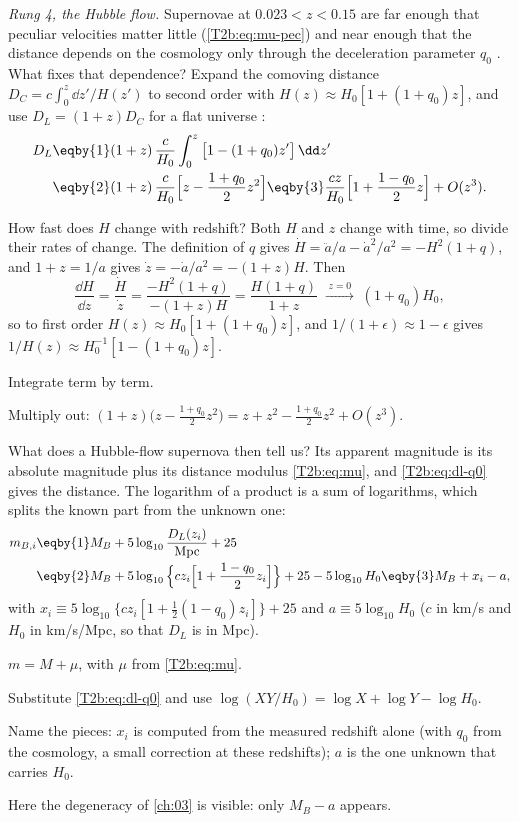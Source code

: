 \emph{Rung 4, the Hubble flow.} Supernovae at $0.023<z<0.15$ are far enough that peculiar velocities matter little (\eqref{T2b:eq:mu-pec}) and near enough that the distance depends on the cosmology only through the deceleration parameter $q_0$ . What fixes that dependence? Expand the comoving distance $D_C=c\int_0^z\dd z'/H(z')$ to second order with $H(z)\approx H_0[1+(1+q_0)z]$, and use $D_L=(1+z)D_C$ for a flat universe \cite[eqs.~(15), (21)]{Hogg1999}:
\begin{align}
  D_L
  &\eqby{1}(1+z)\,\frac{c}{H_0}\int_0^z\big[1-(1+q_0)z'\big]\,\dd z'\nonumber\\
  &\eqby{2}(1+z)\,\frac{c}{H_0}\Big[z-\frac{1+q_0}{2}z^2\Big]
  \eqby{3}\frac{cz}{H_0}\Big[1+\frac{1-q_0}{2}z\Big]+O(z^3).
  \label{T2b:eq:dl-q0}
\end{align}
\begin{explain}
  \item How fast does $H$ change with redshift? Both $H$ and $z$ change with time, so divide their rates of change. The definition of $q$ gives $\dot H=\ddot a/a-\dot a^2/a^2=-H^2(1+q)$, and $1+z=1/a$ gives $\dot z=-\dot a/a^2=-(1+z)H$. Then
        \[
          \frac{\dd H}{\dd z}=\frac{\dot H}{\dot z}=\frac{-H^2(1+q)}{-(1+z)H}=\frac{H(1+q)}{1+z}
          \;\xrightarrow{\;z=0\;}\;(1+q_0)H_0 ,
        \]
        so to first order $H(z)\approx H_0[1+(1+q_0)z]$, and $1/(1+\epsilon)\approx1-\epsilon$ gives $1/H(z)\approx H_0^{-1}[1-(1+q_0)z]$.
  \item Integrate term by term.
  \item Multiply out: $(1+z)\big(z-\tfrac{1+q_0}{2}z^2\big)=z+z^2-\tfrac{1+q_0}{2}z^2+O(z^3)$.
\end{explain}
What does a Hubble-flow supernova then tell us? Its apparent magnitude is its absolute magnitude plus its distance modulus \eqref{T2b:eq:mu}, and \eqref{T2b:eq:dl-q0} gives the distance. The logarithm of a product is a sum of logarithms, which splits the known part from the unknown one:
\begin{align}
  m_{B,i}
  &\eqby{1}M_B+5\log_{10}\frac{D_L(z_i)}{\mathrm{Mpc}}+25\nonumber\\
  &\eqby{2}M_B+5\log_{10}\Big\{cz_i\Big[1+\frac{1-q_0}{2}z_i\Big]\Big\}+25-5\log_{10}H_0
  \eqby{3}M_B+x_i-a ,
  \label{T2b:eq:mb-hf}
\end{align}
with $x_i\equiv5\log_{10}\{cz_i[1+\frac12(1-q_0)z_i]\}+25$ and $a\equiv5\log_{10}H_0$ ($c$ in km/s and $H_0$ in km/s/Mpc, so that $D_L$ is in Mpc).
\begin{explain}
  \item $m=M+\mu$, with $\mu$ from \eqref{T2b:eq:mu}.
  \item Substitute \eqref{T2b:eq:dl-q0} and use $\log(XY/H_0)=\log X+\log Y-\log H_0$.
  \item Name the pieces: $x_i$ is computed from the measured redshift alone (with $q_0$ from the cosmology, a small correction at these redshifts); $a$ is the one unknown that carries $H_0$.
\end{explain}
Here the degeneracy of \cref{ch:03} is visible: only $M_B-a$ appears.

